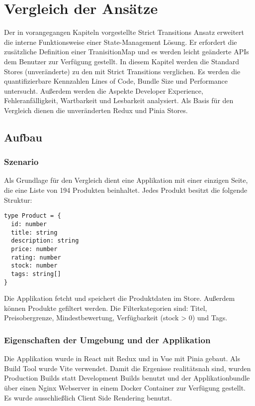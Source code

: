 \chapter{Vergleich der Ansätze} \label{vergleich}


Der in vorangegangen Kapiteln vorgestellte Strict Transitions Ansatz erweitert die interne Funktionsweise einer State-Management Lösung. Er erfordert die zusätzliche Definition einer TranisitionMap und es werden leicht geänderte APIs dem Benutzer zur Verfügung gestellt. In diesem Kapitel werden die Standard Stores (unveränderte) zu den mit Strict Transitions verglichen. Es werden die quantifizierbare Kennzahlen Lines of Code, Bundle Size und Performance untersucht. Außerdem werden die Aspekte Developer Experience, Fehleranfälligkeit, Wartbarkeit und Lesbarkeit analysiert. Als Basis für den Vergleich dienen die unveränderten Redux und Pinia Stores.

\section{Aufbau}

\subsection{Szenario}

Als Grundlage für den Vergleich dient eine Applikation mit einer einzigen Seite, die eine Liste von 194 Produkten beinhaltet. Jedes Produkt besitzt die folgende Struktur:

\begin{lstlisting}
type Product = {
  id: number
  title: string
  description: string
  price: number
  rating: number
  stock: number
  tags: string[]
}  
\end{lstlisting}

Die Applikation fetcht und speichert die Produktdaten im Store. Außerdem können Produkte gefiltert werden. Die Filterkategorien sind: Titel, Preisobergrenze, Mindestbewertung, Verfügbarkeit (stock > 0) und Tags.

\subsection{Eigenschaften der Umgebung und der Applikation}

Die Applikation wurde in React mit Redux und in Vue mit Pinia gebaut. Als Build Tool wurde Vite verwendet. Damit die Ergenisse realitätsnah sind, wurden Production Builds statt Development Builds benutzt und der Applikationbundle über einen Nginx Webserver in einem Docker Container zur Verfügung gestellt. Es wurde ausschließlich Client Side Rendering benutzt.

